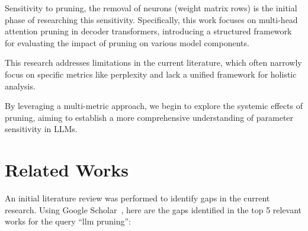 \documentclass[conference]{IEEEtran}
\begin{document}
    Sensitivity to pruning, the removal of neurons (weight matrix rows) is the initial phase of researching this sensitivity.
    Specifically, this work focuses on multi-head attention pruning in decoder transformers, introducing a structured framework for evaluating the impact of pruning on various model components.

    This research addresses limitations in the current literature, which often narrowly focus on specific metrics like perplexity and lack a unified framework for holistic analysis.

    By leveraging a multi-metric approach, we begin to explore the systemic effects of pruning, aiming to establish a more comprehensive understanding of parameter sensitivity in LLMs.

    \section{Related Works}

    An initial literature review was performed to identify gaps in the current research.
    Using Google Scholar~\cite{GoogleScholar}, here are the gaps identified in the top 5 relevant works for the query ``llm pruning'':
\end{document}

